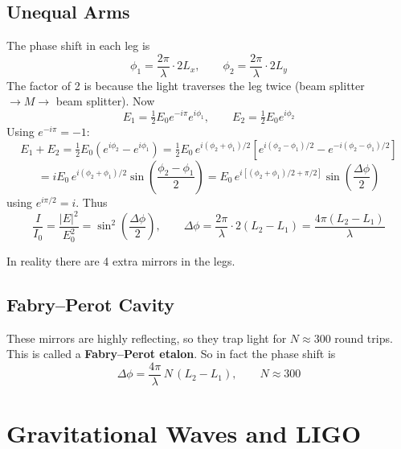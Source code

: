 \documentclass[11pt]{report}
\begin{document}
\subsection*{Unequal Arms}

The phase shift in each leg is
\begin{equation}
\phi_1 = \frac{2\pi}{\lambda}\cdot 2 L_x, \qquad \phi_2 = \frac{2\pi}{\lambda}\cdot 2 L_y
\end{equation}
The factor of 2 is because the light traverses the leg twice (beam splitter $\to M \to$ beam splitter). Now
\begin{equation}
E_1 = \tfrac{1}{2}E_0 e^{-i\pi} e^{i\phi_1}, \qquad E_2 = \tfrac{1}{2}E_0 e^{i\phi_2}
\end{equation}
Using $e^{-i\pi} = -1$:
\begin{equation}
E_1 + E_2 = \tfrac{1}{2}E_0(e^{i\phi_2} - e^{i\phi_1}) = \tfrac{1}{2}E_0\,e^{i(\phi_2 + \phi_1)/2}\!\left[e^{i(\phi_2 - \phi_1)/2} - e^{-i(\phi_2 - \phi_1)/2}\right]
\end{equation}
\begin{equation}
= i E_0\,e^{i(\phi_2 + \phi_1)/2}\sin\!\left(\frac{\phi_2 - \phi_1}{2}\right) = E_0\,e^{i[(\phi_2+\phi_1)/2 + \pi/2]}\sin\!\left(\frac{\Delta\phi}{2}\right)
\end{equation}
using $e^{i\pi/2} = i$. Thus
\begin{equation}
\boxed{\frac{I}{I_0} = \frac{|E|^2}{E_0^2} = \sin^2\!\left(\frac{\Delta\phi}{2}\right), \qquad \Delta\phi = \frac{2\pi}{\lambda}\cdot 2(L_2 - L_1) = \frac{4\pi(L_2 - L_1)}{\lambda}}
\end{equation}

In reality there are 4 extra mirrors in the legs.

\subsection*{Fabry--Perot Cavity}

These mirrors are highly reflecting, so they trap light for $N \approx 300$ round trips. This is called a \textbf{Fabry--Perot etalon}. So in fact the phase shift is
\begin{equation}
\boxed{\Delta\phi = \frac{4\pi}{\lambda}\,N\,(L_2 - L_1), \qquad N \approx 300}
\end{equation}

\section{Gravitational Waves and LIGO}
\end{document}
